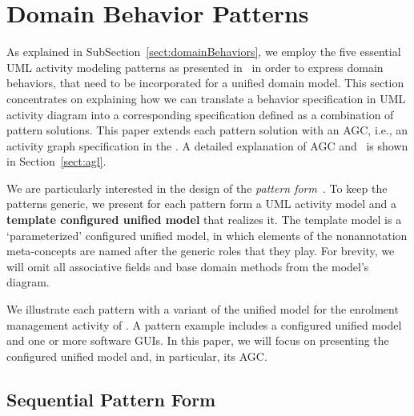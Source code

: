 \section{Domain Behavior Patterns}
\label{sect:behaviorPatterns}

As explained in SubSection~\ref{sect:domainBehaviors}, we employ the five essential UML activity modeling patterns as presented in~\cite{le_domain_2018} in order to express domain behaviors, that need to be incorporated for a unified domain model. This section concentrates on explaining how we can translate a behavior specification in UML activity diagram into a corresponding specification defined as a combination of pattern solutions. This paper extends each pattern solution with an AGC, i.e., an activity graph specification in the \agl. A detailed explanation of AGC and \agl~is shown in Section~\ref{sect:agl}.

We are particularly interested in the design of the \textit{pattern form}~\cite{riehle_understanding_1996, gamma_design_1994}. To keep the patterns generic, we present for each pattern form a UML activity model and a \textbf{template configured unified model} that realizes it. The template model is a `parameterized' configured unified model, in which elements of the nonannotation meta-concepts are named after the generic roles that they play. 
%
For brevity, we will omit all associative fields and base domain methods from the model's diagram.

We illustrate each pattern with a variant of the unified model for the enrolment management activity of \courseman. A pattern example includes a configured unified model and one or more software GUIs. In this paper, we will focus on presenting the configured unified model and, in particular, its AGC. 


\subsection{Sequential Pattern Form} \label{sect:sequential-pattern}

